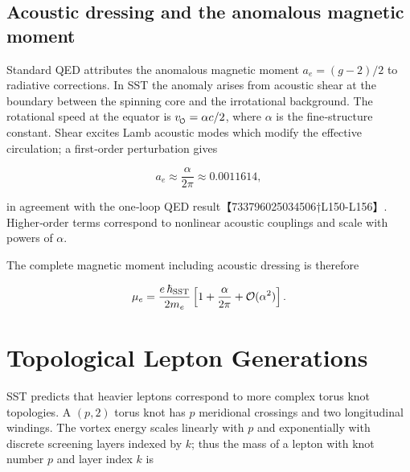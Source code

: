 \documentclass[11pt]{article}
\newcommand{\swirlarrow}{\mkern-2mu\scriptscriptstyle\boldsymbol{\circlearrowleft}}
\newcommand{\vscore}{v_{\swirlarrow}}                    %
\begin{document}
\subsection{Acoustic dressing and the anomalous magnetic moment}


Standard QED attributes the anomalous magnetic moment $a_e=(g-2)/2$ to radiative corrections.  In SST the anomaly arises from acoustic shear at the boundary between the spinning core and the irrotational background.  The rotational speed at the equator is $\vscore = \alpha c/2$, where $\alpha$ is the fine‑structure constant.  Shear excites Lamb acoustic modes which modify the effective circulation; a first‑order perturbation gives


\begin{equation}


    a_e \approx \frac{\alpha}{2\pi} \approx 0.0011614,


    \label{eq:ae}


\end{equation}


in agreement with the one‑loop QED result【733796025034506†L150-L156】.  Higher‑order terms correspond to nonlinear acoustic couplings and scale with powers of $\alpha$.






The complete magnetic moment including acoustic dressing is therefore


\begin{equation}


    \mu_e = \frac{e\,\hbar_{\rm SST}}{2 m_e}\left[1 + \frac{\alpha}{2\pi} + \mathcal{O}(\alpha^2)\right].


\end{equation}








\section{Topological Lepton Generations}


\label{sec:leptons}


SST predicts that heavier leptons correspond to more complex torus knot topologies.  A $(p,2)$ torus knot has $p$ meridional crossings and two longitudinal windings.  The vortex energy scales linearly with $p$ and exponentially with discrete screening layers indexed by $k$; thus the mass of a lepton with knot number $p$ and layer index $k$ is
\end{document}
